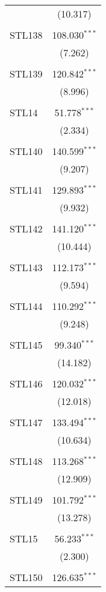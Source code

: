 \begin{table}[!htbp]
\begin{tabular}{@{\extracolsep{5pt}}lc}
  & (10.317) \\ 
  & \\ 
 STL138 & 108.030$^{***}$ \\ 
  & (7.262) \\ 
  & \\ 
 STL139 & 120.842$^{***}$ \\ 
  & (8.996) \\ 
  & \\ 
 STL14 & 51.778$^{***}$ \\ 
  & (2.334) \\ 
  & \\ 
 STL140 & 140.599$^{***}$ \\ 
  & (9.207) \\ 
  & \\ 
 STL141 & 129.893$^{***}$ \\ 
  & (9.932) \\ 
  & \\ 
 STL142 & 141.120$^{***}$ \\ 
  & (10.444) \\ 
  & \\ 
 STL143 & 112.173$^{***}$ \\ 
  & (9.594) \\ 
  & \\ 
 STL144 & 110.292$^{***}$ \\ 
  & (9.248) \\ 
  & \\ 
 STL145 & 99.340$^{***}$ \\ 
  & (14.182) \\ 
  & \\ 
 STL146 & 120.032$^{***}$ \\ 
  & (12.018) \\ 
  & \\ 
 STL147 & 133.494$^{***}$ \\ 
  & (10.634) \\ 
  & \\ 
 STL148 & 113.268$^{***}$ \\ 
  & (12.909) \\ 
  & \\ 
 STL149 & 101.792$^{***}$ \\ 
  & (13.278) \\ 
  & \\ 
 STL15 & 56.233$^{***}$ \\ 
  & (2.300) \\ 
  & \\ 
 STL150 & 126.635$^{***}$ \\ 

\end{tabular}
\end{table}

